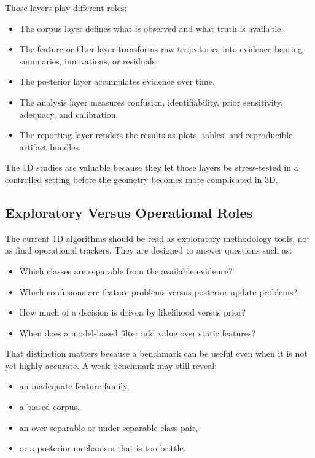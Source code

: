 \documentclass[11pt]{article}
\begin{document}
Those layers play different roles:
\begin{itemize}[leftmargin=1.5em]
    \item The corpus layer defines what is observed and what truth is
    available.
    \item The feature or filter layer transforms raw trajectories into
    evidence-bearing summaries, innovations, or residuals.
    \item The posterior layer accumulates evidence over time.
    \item The analysis layer measures confusion, identifiability, prior
    sensitivity, adequacy, and calibration.
    \item The reporting layer renders the results as plots, tables, and
    reproducible artifact bundles.
\end{itemize}

The 1D studies are valuable because they let those layers be stress-tested in
a controlled setting before the geometry becomes more complicated in 3D.

\subsection{Exploratory Versus Operational Roles}

The current 1D algorithms should be read as exploratory methodology tools,
not as final operational trackers. They are designed to answer questions such
as:
\begin{itemize}[leftmargin=1.5em]
    \item Which classes are separable from the available evidence?
    \item Which confusions are feature problems versus posterior-update
    problems?
    \item How much of a decision is driven by likelihood versus prior?
    \item When does a model-based filter add value over static features?
\end{itemize}

That distinction matters because a benchmark can be useful even when it is not
yet highly accurate. A weak benchmark may still reveal:
\begin{itemize}[leftmargin=1.5em]
    \item an inadequate feature family,
    \item a biased corpus,
    \item an over-separable or under-separable class pair,
    \item or a posterior mechanism that is too brittle.
\end{itemize}
\end{document}
